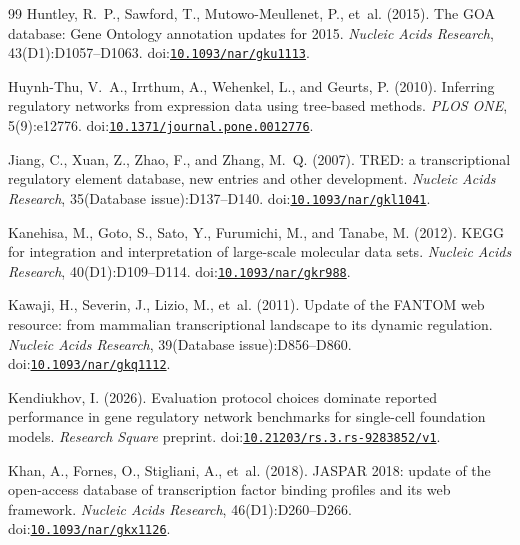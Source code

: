 \documentclass[11pt,a4paper]{article}
\begin{document}
\begin{thebibliography}{99}
Huntley, R.~P., Sawford, T., Mutowo-Meullenet, P., et~al. (2015).
\newblock The GOA database: Gene Ontology annotation updates for 2015.
\newblock \emph{Nucleic Acids Research}, 43(D1):D1057--D1063.
\newblock doi:\href{https://doi.org/10.1093/nar/gku1113}{\nolinkurl{10.1093/nar/gku1113}}.

Huynh-Thu, V.~A., Irrthum, A., Wehenkel, L., and Geurts, P. (2010).
\newblock Inferring regulatory networks from expression data using tree-based methods.
\newblock \emph{PLOS ONE}, 5(9):e12776.
\newblock doi:\href{https://doi.org/10.1371/journal.pone.0012776}{\nolinkurl{10.1371/journal.pone.0012776}}.

Jiang, C., Xuan, Z., Zhao, F., and Zhang, M.~Q. (2007).
\newblock TRED: a transcriptional regulatory element database, new entries and other development.
\newblock \emph{Nucleic Acids Research}, 35(Database issue):D137--D140.
\newblock doi:\href{https://doi.org/10.1093/nar/gkl1041}{\nolinkurl{10.1093/nar/gkl1041}}.

Kanehisa, M., Goto, S., Sato, Y., Furumichi, M., and Tanabe, M. (2012).
\newblock KEGG for integration and interpretation of large-scale molecular data sets.
\newblock \emph{Nucleic Acids Research}, 40(D1):D109--D114.
\newblock doi:\href{https://doi.org/10.1093/nar/gkr988}{\nolinkurl{10.1093/nar/gkr988}}.

Kawaji, H., Severin, J., Lizio, M., et~al. (2011).
\newblock Update of the FANTOM web resource: from mammalian transcriptional landscape to its dynamic regulation.
\newblock \emph{Nucleic Acids Research}, 39(Database issue):D856--D860.
\newblock doi:\href{https://doi.org/10.1093/nar/gkq1112}{\nolinkurl{10.1093/nar/gkq1112}}.

Kendiukhov, I. (2026).
\newblock Evaluation protocol choices dominate reported performance in gene regulatory network benchmarks for single-cell foundation models.
\newblock \emph{Research Square} preprint.
\newblock doi:\href{https://doi.org/10.21203/rs.3.rs-9283852/v1}{\nolinkurl{10.21203/rs.3.rs-9283852/v1}}.

Khan, A., Fornes, O., Stigliani, A., et~al. (2018).
\newblock JASPAR 2018: update of the open-access database of transcription factor binding profiles and its web framework.
\newblock \emph{Nucleic Acids Research}, 46(D1):D260--D266.
\newblock doi:\href{https://doi.org/10.1093/nar/gkx1126}{\nolinkurl{10.1093/nar/gkx1126}}.


\end{thebibliography}
\end{document}
